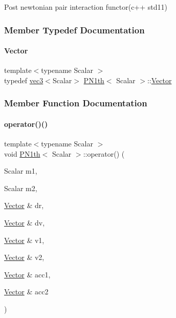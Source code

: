 Post newtonian pair interaction functor(c++ std11) 

\subsubsection{Member Typedef Documentation}
\mbox{\label{class_p_n1th_affb0517b66197be4e03c50d632f35c3f}} 
\paragraph{\texorpdfstring{Vector}{Vector}}
{\footnotesize\ttfamily template$<$typename Scalar $>$ \\
typedef \mbox{\hyperlink{structvec3}{vec3}}$<$Scalar$>$ \mbox{\hyperlink{class_p_n1th}{P\+N1th}}$<$ Scalar $>$\+::\mbox{\hyperlink{class_p_n1th_affb0517b66197be4e03c50d632f35c3f}{Vector}}\hspace{0.3cm}{\ttfamily [private]}}



\subsubsection{Member Function Documentation}
\mbox{\label{class_p_n1th_a1ed48e417256ef44bf6faa3e7c433b7e}} 
\paragraph{\texorpdfstring{operator()()}{operator()()}}
{\footnotesize\ttfamily template$<$typename Scalar $>$ \\
void \mbox{\hyperlink{class_p_n1th}{P\+N1th}}$<$ Scalar $>$\+::operator() (\begin{DoxyParamCaption}\item[{Scalar}]{m1,  }\item[{Scalar}]{m2,  }\item[{\mbox{\hyperlink{class_p_n1th_affb0517b66197be4e03c50d632f35c3f}{Vector}} \&}]{dr,  }\item[{\mbox{\hyperlink{class_p_n1th_affb0517b66197be4e03c50d632f35c3f}{Vector}} \&}]{dv,  }\item[{\mbox{\hyperlink{class_p_n1th_affb0517b66197be4e03c50d632f35c3f}{Vector}} \&}]{v1,  }\item[{\mbox{\hyperlink{class_p_n1th_affb0517b66197be4e03c50d632f35c3f}{Vector}} \&}]{v2,  }\item[{\mbox{\hyperlink{class_p_n1th_affb0517b66197be4e03c50d632f35c3f}{Vector}} \&}]{acc1,  }\item[{\mbox{\hyperlink{class_p_n1th_affb0517b66197be4e03c50d632f35c3f}{Vector}} \&}]{acc2 }\end{DoxyParamCaption})\hspace{0.3cm}{\ttfamily [inline]}}



